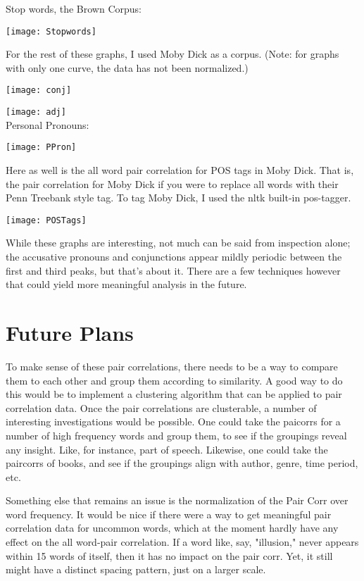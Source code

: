 \documentclass[11pt,letterpaper]{article}
\theoremstyle{definition}
\begin{document}
Stop words, the Brown Corpus:

\texttt{[image: Stopwords]}

For the rest of these graphs, I used Moby Dick as a corpus. (Note: for graphs with only one curve, the data has not been normalized.)

\texttt{[image: conj]}

\texttt{[image: adj]}
 \[\]
 \[\]
 \[\]
 \[\]
 \[\]
 \[\]
 \[\]
 \[\]
 \[\]
Personal Pronouns:

\texttt{[image: PPron]}

Here as well is the all word pair correlation for POS tags in Moby Dick. That is, the pair correlation for Moby Dick if you were to replace all words with their Penn Treebank style tag. To tag Moby Dick, I used the nltk built-in pos-tagger.

\texttt{[image: POSTags]}

While these graphs are interesting, not much can be said from inspection alone; the accusative pronouns and conjunctions appear mildly periodic between the first and third peaks, but that's about it. There are a few techniques however that could yield more meaningful analysis in the future.

\section{Future Plans}

To make sense of these pair correlations, there needs to be a way to compare them to each other and group them according to similarity. A good way to do this would be to implement a clustering algorithm that can be applied to pair correlation data.
Once the pair correlations are clusterable, a number of interesting investigations would be possible. One could take the paicorrs for a number of high frequency words and group them, to see if the groupings reveal any insight. Like, for instance, part of speech. Likewise, one could take the paircorrs of books, and see if the groupings align with author, genre, time period, etc.

Something else that remains an issue is the normalization of the Pair Corr over word frequency. It would be nice if there were a way to get meaningful pair correlation data for uncommon words, which at the moment hardly have any effect on the all word-pair correlation. If a word like, say, "illusion," never appears within 15 words of itself, then it has no impact on the pair corr. Yet, it still might have a distinct spacing pattern, just on a larger scale. 
\end{document}
